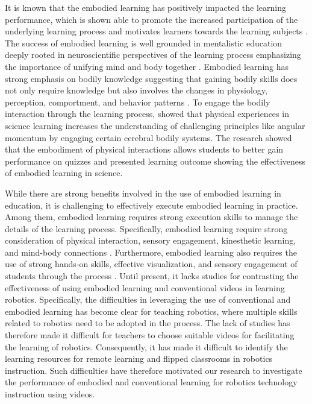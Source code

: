 \documentclass[fleqn,10pt]{JLA_article} %
\begin{document}
It is known that the embodied learning has positively impacted the learning performance, which is shown able to promote the increased participation of the underlying learning process and motivates learners towards the learning subjects \cite{kontra2012embodied,ioannou2020technology}. The success of embodied learning is well grounded in mentalistic education deeply rooted in neuroscientific perspectives of the learning process emphasizing the importance of unifying mind and body together \cite{macedonia2019embodied}. Embodied learning has strong emphasis on bodily knowledge suggesting that gaining bodily skills does not only require knowledge but also involves the changes in physiology, perception, comportment, and behavior patterns \cite{downey2010practice}. To engage the bodily interaction through the learning process,  showed that physical experiences in science learning increases the understanding of challenging principles like angular momentum by engaging certain cerebral bodily systems. The research showed that the embodiment of physical interactions allows students to better gain performance on quizzes and presented learning outcome showing the effectiveness of embodied learning in science.

While there are strong benefits involved in the use of embodied learning in education, it is challenging to effectively execute embodied learning in practice. Among them, embodied learning requires strong execution skills to manage the details of the learning process. Specifically, embodied learning require strong consideration of physical interaction, sensory engagement, kinesthetic learning, and mind-body connections \cite{anderson2003embodied,barsalou2008grounded,skulmowski2018embodied}. Furthermore, embodied learning also requires the use of strong hands-on skills, effective visualization, and sensory engagement of students through the process \cite{dede2014role,poria2017review}. Until present, it lacks studies for contrasting the effectiveness of using embodied learning and conventional videos in learning robotics. Specifically, the difficulties in leveraging the use of conventional and embodied learning has become clear for teaching robotics, where multiple skills related to robotics need to be adopted in the process. The lack of studies has therefore made it difficult for teachers to choose suitable videos for facilitating the learning of robotics. Consequently, it has made it difficult to identify the learning resources for remote learning and flipped classrooms in robotics instruction. Such difficulties have therefore motivated our research to investigate the performance of embodied and conventional learning for robotics technology instruction using videos.
\end{document}
